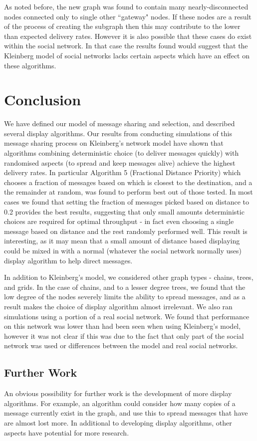 \documentclass[bsc,frontabs,twoside,singlespacing,parskip,deptreport]{infthesis}     %
\begin{document}
As noted before, the new graph was found to contain many nearly-disconnected nodes connected only to single other ``gateway" nodes. If these nodes are a result of the process of creating the subgraph then this may contribute to the lower than expected delivery rates. However it is also possible that these cases do exist within the social network. In that case the results found would suggest that the Kleinberg model of social networks lacks certain aspects which have an effect on these algorithms.

\chapter{Conclusion} \label{chapter5}
We have defined our model of message sharing and selection, and described several display algorithms. Our results from conducting simulations of this message sharing process on Kleinberg's network model have shown that algorithms combining deterministic choice (to deliver messages quickly) with randomised aspects (to spread and keep messages alive) achieve the highest delivery rates. In particular Algorithm 5 (Fractional Distance Priority) which chooses a fraction of messages based on which is closest to the destination, and a the remainder at random, was found to perform best out of those tested. In most cases we found that setting the fraction of messages picked based on distance to 0.2 provides the best results, suggesting that only small amounts deterministic choices are required for optimal throughput - in fact even choosing a single message based on distance and the rest randomly performed well. This result is interesting, as it may mean that a small amount of distance based displaying could be mixed in with a normal (whatever the social network normally uses) display algorithm to help direct messages.

In addition to Kleinberg's model, we considered other graph types - chains, trees, and grids. In the case of chains, and to a lesser degree trees, we found that the low degree of the nodes severely limits the ability to spread messages, and as a result makes the choice of display algorithm almost irrelevant. We also ran simulations using a portion of a real social network. We found that performance on this network was lower than had been seen when using Kleinberg's model, however it was not clear if this was due to the fact that only part of the social network was used or differences between the model and real social networks.

\section{Further Work}
An obvious possibility for further work is the development of more display algorithms. For example, an algorithm could consider how many copies of a message currently exist in the graph, and use this to spread messages that have are almost lost more. In additional to developing display algorithms, other aspects have potential for more research.
\end{document}
